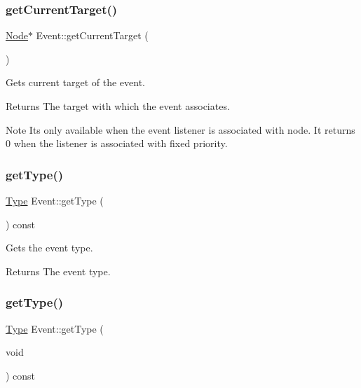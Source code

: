 \subsubsection{\texorpdfstring{get\+Current\+Target()}{getCurrentTarget()}\hspace{0.1cm}{\footnotesize\ttfamily [2/2]}}
{\footnotesize\ttfamily \hyperlink{classNode}{Node}$\ast$ Event\+::get\+Current\+Target (\begin{DoxyParamCaption}{ }\end{DoxyParamCaption})\hspace{0.3cm}{\ttfamily [inline]}}

Gets current target of the event. \begin{DoxyReturn}{Returns}
The target with which the event associates. 
\end{DoxyReturn}
\begin{DoxyNote}{Note}
It\textquotesingle{}s only available when the event listener is associated with node. It returns 0 when the listener is associated with fixed priority. 
\end{DoxyNote}
\mbox{\label{classEvent_af9d60aed1623a8e4d5e673b3f102dfc3}} 
\subsubsection{\texorpdfstring{get\+Type()}{getType()}\hspace{0.1cm}{\footnotesize\ttfamily [1/2]}}
{\footnotesize\ttfamily \hyperlink{classEvent_a2abf13b5be49315e9e362af02029f058}{Type} Event\+::get\+Type (\begin{DoxyParamCaption}{ }\end{DoxyParamCaption}) const\hspace{0.3cm}{\ttfamily [inline]}}

Gets the event type.

\begin{DoxyReturn}{Returns}
The event type. 
\end{DoxyReturn}
\mbox{\label{classEvent_af9d60aed1623a8e4d5e673b3f102dfc3}} 
\subsubsection{\texorpdfstring{get\+Type()}{getType()}\hspace{0.1cm}{\footnotesize\ttfamily [2/2]}}
{\footnotesize\ttfamily \hyperlink{classEvent_a2abf13b5be49315e9e362af02029f058}{Type} Event\+::get\+Type (\begin{DoxyParamCaption}\item[{void}]{ }\end{DoxyParamCaption}) const\hspace{0.3cm}{\ttfamily [inline]}}

